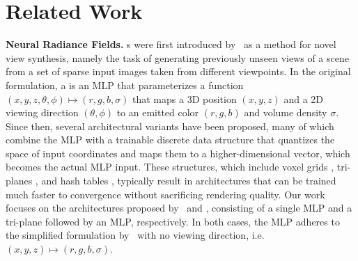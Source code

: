 \section{Related Work}
\label{sec:related}

\textbf{Neural Radiance Fields.}
\nerf{}s were first introduced by \citealp{mildenhall2020nerf}\ as a method for novel view synthesis, namely the task of generating previously unseen views of a scene from a set of sparse input images taken from different viewpoints. In the original formulation, a \nerf{} is an MLP that parameterizes a function $(x,y,z,\theta,\phi)\mapsto(r,g,b,\sigma)$ that maps a 3D position $(x,y,z)$ and a 2D viewing direction $(\theta,\phi)$ to an emitted color $(r,g,b)$ and volume density $\sigma$.
Since then, several architectural variants have been proposed, many of which combine the MLP with a trainable discrete data structure that quantizes the space of input coordinates and maps them to a higher-dimensional vector, which becomes the actual MLP input. These structures, which include voxel grids \cite{liu2020neural}, tri-planes \cite{chan2022efficient}, and hash tables \cite{muller2022instant, barron2023zip}, typically result in \nerf{} architectures that can be trained much faster to convergence without sacrificing rendering quality.
Our work focuses on the \nerf{} architectures proposed by \citealp{ramirez2024deep}\ and \citealp{cardace2024neural}, consisting of a single MLP and a tri-plane followed by an MLP, respectively. In both cases, the MLP adheres to the simplified formulation by \citealp{mildenhall2020nerf}\ with no viewing direction, i.e.\ $(x,y,z)\mapsto(r,g,b,\sigma)$.

